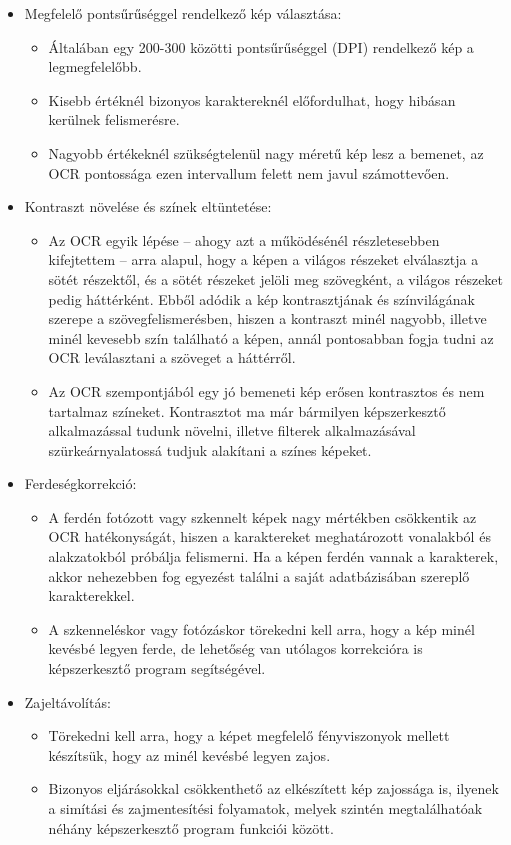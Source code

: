 \documentclass[12pt]{report}
\begin{document}
\begin{itemize}
    \item Megfelelő pontsűrűséggel rendelkező kép választása:
    \begin{itemize}
       \item Általában egy 200-300 közötti pontsűrűséggel (DPI) rendelkező kép a legmegfelelőbb.
       \item Kisebb értéknél bizonyos karaktereknél előfordulhat, hogy hibásan kerülnek felismerésre.
       \item Nagyobb értékeknél szükségtelenül nagy méretű kép lesz a bemenet, az OCR pontossága ezen intervallum felett nem javul számottevően.
    \end{itemize}
    \item Kontraszt növelése és színek eltüntetése:
    \begin{itemize}
	   \item Az OCR egyik lépése – ahogy azt a működésénél részletesebben kifejtettem –  arra alapul, hogy a képen a világos részeket elválasztja a sötét részektől, és a sötét részeket jelöli meg szövegként, a világos részeket pedig háttérként. Ebből adódik a kép kontrasztjának és színvilágának szerepe a szövegfelismerésben, hiszen a kontraszt minél nagyobb, illetve minél kevesebb szín található a képen, annál pontosabban fogja tudni az OCR leválasztani a szöveget a háttérről.
       \item Az OCR szempontjából egy jó bemeneti kép erősen kontrasztos és nem tartalmaz színeket. Kontrasztot ma már bármilyen képszerkesztő alkalmazással tudunk növelni, illetve filterek alkalmazásával szürkeárnyalatossá tudjuk alakítani a színes képeket.
    \end{itemize}
    \pagebreak
    \item Ferdeségkorrekció:
    \begin{itemize}
	   \item A ferdén fotózott vagy szkennelt képek nagy mértékben csökkentik az OCR hatékonyságát, hiszen a karaktereket meghatározott vonalakból és alakzatokból próbálja felismerni. Ha a képen ferdén vannak a karakterek, akkor nehezebben fog egyezést találni a saját adatbázisában szereplő karakterekkel.
       \item A szkenneléskor vagy fotózáskor törekedni kell arra, hogy a kép minél kevésbé legyen ferde, de lehetőség van utólagos korrekcióra is képszerkesztő program segítségével.
    \end{itemize}
    \item Zajeltávolítás:
    \begin{itemize}
	   \item Törekedni kell arra, hogy a képet megfelelő fényviszonyok mellett készítsük, hogy az minél kevésbé legyen zajos.
       \item Bizonyos eljárásokkal csökkenthető az elkészített kép zajossága is, ilyenek a simítási és zajmentesítési folyamatok, melyek szintén megtalálhatóak néhány képszerkesztő program funkciói között.
    \end{itemize}
\end{itemize}
\end{document}
